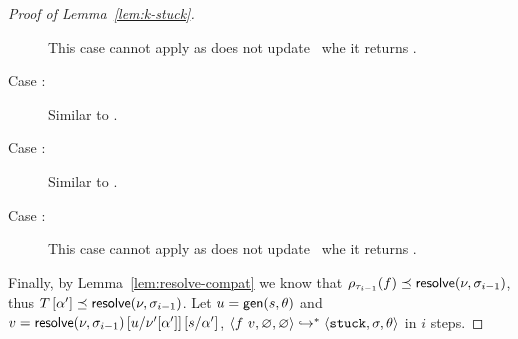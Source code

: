 \begin{proof}[Proof of Lemma~\ref{lem:k-stuck}]
\begin{description}
      This case cannot apply as \forcesym does not update \tsu\ whe
      it returns \stuck.
    \item[Case \renodebadtwo:]
      Similar to \renodegood.
    \item[Case \rulename{E-Case-Good\{1,2\}}:]
      Similar to \replusgood.
    \item[Case \recasebad:]
      This case cannot apply as \forcesym does not update \tsu\ whe
      it returns \stuck.
    \end{description}
  Finally, by Lemma~\ref{lem:resolve-compat} we know that
  $\vsub{\ptype{\trace_{i-1}}{f}}{\resolve{\ehole}{\vsu_{i-1}}}$,
  thus $\vsub{\intctx{\thole'}}{\resolve{\ehole}{\vsu_{i-1}}}$.
  Let $u = \gen{s}{\tsu}$
  and $v = \resolve{\ehole}{\vsu_{i-1}}\sub{\ehole'[\thole']}{u}\sub{\thole'}{s}$,
  $\steps{\eapp{f}{v}}{\emptysu}{\emptysu}{\stuck}{\vsu}{\tsu}$ in $i$ steps.


\end{proof}
